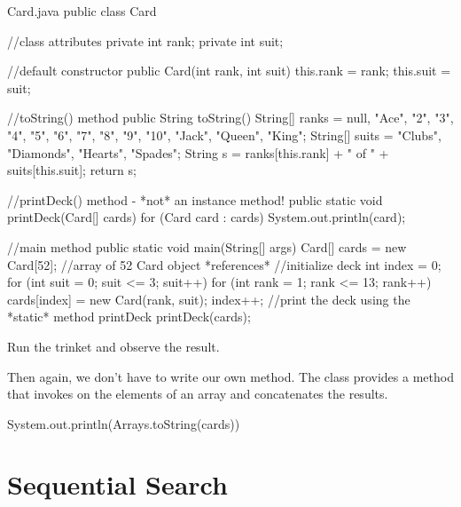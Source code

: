 \begin{trinket} [640] {Card.java}
public class Card {
    //class attributes
    private int rank;
    private int suit;
    
    //default constructor
    public Card(int rank, int suit) {
        this.rank = rank;
        this.suit = suit;
    }
    
    //toString() method
    public String toString() {
       String[] ranks = {null, "Ace", "2", "3", "4", "5", "6",
               "7", "8", "9", "10", "Jack", "Queen", "King"};
       String[] suits = {"Clubs", "Diamonds", "Hearts", "Spades"};
       String s = ranks[this.rank] + " of " + suits[this.suit];
       return s;
    }
    
    //printDeck() method - *not* an instance method!
    public static void printDeck(Card[] cards) {
           for (Card card : cards) {
              System.out.println(card);
           }
    }
    
    //main method
    public static void main(String[] args) {
       Card[] cards = new Card[52];  //array of 52 Card object *references*
       //initialize deck
       int index = 0;
       for (int suit = 0; suit <= 3; suit++) {
           for (int rank = 1; rank <= 13; rank++) {
               cards[index] = new Card(rank, suit);
               index++;
           }
       }
       //print the deck using the *static* method printDeck
       printDeck(cards);
    }
}
\end{trinket}

Run the trinket and observe the result.  


Then again, we don't have to write our own  method.
The  class provides a  method that invokes  on the elements of an array and concatenates the results.

\begin{code}
System.out.println(Arrays.toString(cards))
\end{code}


\section{Sequential Search}

